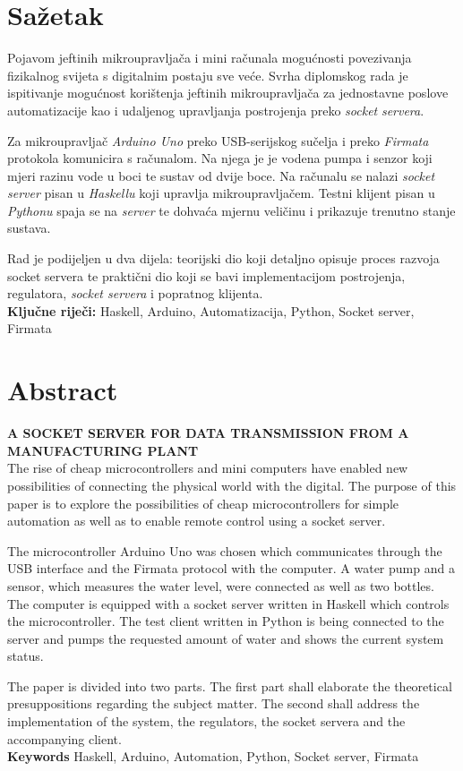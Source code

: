 \newpage

\chapter*{Sažetak}
Pojavom jeftinih mikroupravljača i mini računala mogućnosti povezivanja
fizikalnog svijeta s digitalnim postaju sve veće.
Svrha diplomskog rada je ispitivanje mogućnost korištenja jeftinih mikroupravljača
za jednostavne poslove automatizacije kao i udaljenog upravljanja postrojenja
preko \emph{socket} \emph{servera}.

Za mikroupravljač \emph{Arduino Uno} preko USB-serijskog sučelja i preko \emph{Firmata}
protokola komunicira s računalom. Na njega je je vodena pumpa i senzor koji mjeri
razinu vode u boci te sustav od dvije boce. Na računalu se nalazi \emph{socket} \emph{server}
pisan u \emph{Haskellu} koji upravlja mikroupravljačem. Testni klijent pisan u
\emph{Pythonu} spaja se na \emph{server} te dohvaća mjernu veličinu
i prikazuje trenutno stanje sustava.

Rad je podijeljen u dva dijela: teorijski dio koji detaljno opisuje proces razvoja socket
servera te praktični dio koji se bavi implementacijom postrojenja, regulatora,
\emph{socket servera} i popratnog klijenta.
\\

\noindent\textbf{Ključne riječi:} Haskell, Arduino, Automatizacija,
Python, Socket server, Firmata
\chapter*{Abstract}
{\large\bfseries\MakeUppercase{A socket server for data transmission from a manufacturing plant}}
\\

The rise of cheap microcontrollers and mini computers have enabled new possibilities
of connecting the physical world with the digital.
The purpose of this paper is to explore the possibilities of cheap microcontrollers
for simple automation as well as to enable remote control using a socket server.

The microcontroller Arduino Uno was chosen which communicates through the USB
interface and the  Firmata protocol with the computer. A water pump and a sensor,
which measures the water level, were connected as well as two bottles.
The computer is equipped with a socket server written in Haskell
which controls the microcontroller. The test client written in Python is being
connected to the server and pumps the requested amount of water and shows the
current system status.

The paper is divided into two parts. The first part shall elaborate the theoretical presuppositions
regarding the subject matter. The second shall address the implementation of the system,
the regulators, the socket servera and the accompanying client.
\\

\noindent\textbf{Keywords} Haskell, Arduino, Automation,
Python, Socket server, Firmata

